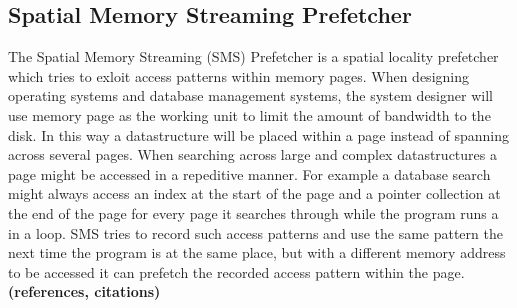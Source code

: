 \subsection{Spatial Memory Streaming Prefetcher}
\label{sec:smsPrefetcher}

The Spatial Memory Streaming (SMS) Prefetcher is a spatial locality
prefetcher which tries to exloit access patterns within memory
pages. When designing operating systems and database management
systems, the system designer will use memory page as the working unit
to limit the amount of bandwidth to the disk. In this way a
datastructure will be placed within a page instead of spanning across several
pages. When searching across large and complex datastructures a page
might be accessed in a repeditive manner. For example a database search
might always access an index at the start of the page and a pointer
collection at the end of the page for every page it searches through
while the program runs a in a loop. SMS tries to record such access
patterns and use the same pattern the next time the program is at the
same place, but with a different memory address to be accessed it can
prefetch the recorded access pattern within the page. {\bf (references,
  citations)}
